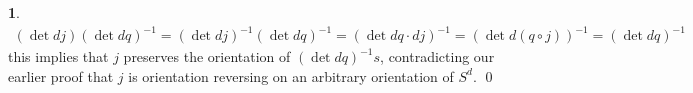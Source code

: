 \documentclass[10.5pt]{article}
\theoremstyle{definition}
\newtheorem{pb}{}
\begin{document}
\begin{pb}
        \begin{align*}
            (\det dj)(\det dq)^{-1} = (\det dj)^{-1}(\det dq)^{-1} = (\det dq \cdot dj)^{-1} = (\det d(q \circ j))^{-1} = (\det dq)^{-1}
        \end{align*}
        this implies that \(j\) preserves the orientation of \((\det dq)^{-1}s\), contradicting our earlier proof that \(j\) is orientation reversing on an arbitrary orientation of \(S^d\). \qed
    \end{pb}
\end{document}
